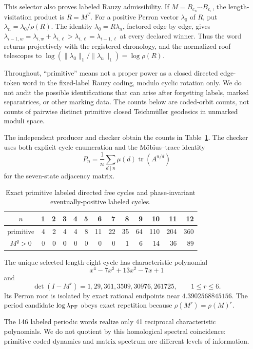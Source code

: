 \documentclass[11pt]{article}
\theoremstyle{remark}
\begin{document}
This selector also proves labeled Rauzy admissibility.  If
$M=B_{e_n}\cdots B_{e_1}$, the length-visitation product is $R=M^T$.  For a
positive Perron vector $\lambda_0$ of $R$, put
$\lambda_n=\lambda_0/\rho(R)$.  The identity
$\lambda_0=R\lambda_n$, factored edge by edge, gives
$\lambda_{i-1,w}=\lambda_{i,w}+\lambda_{i,\ell}>
\lambda_{i,\ell}=\lambda_{i-1,\ell}$ at every declared winner.  Thus the word
returns projectively with the registered chronology, and the normalized roof
telescopes to $\log(\|\lambda_0\|_1/\|\lambda_n\|_1)=\log\rho(R)$.

Throughout, ``primitive'' means not a proper power as a closed directed
edge-token word in the fixed-label Rauzy coding, modulo cyclic rotation only.
We do not audit the possible identifications that can arise after forgetting
labels, marked separatrices, or other marking data.  The counts below are
coded-orbit counts, not counts of pairwise distinct primitive closed
Teichm\"uller geodesics in unmarked moduli space.

The independent producer and checker obtain the counts in
Table~\ref{tab:counts}.  The checker uses both explicit cycle enumeration and
the M\"obius--trace identity
\[
 P_n=\frac1n\sum_{d\mid n}\mu(d)\operatorname{tr}(A^{n/d})
\]
for the seven-state adjacency matrix.

\begin{table}[ht]
\centering
\small
\begin{tabular}{crrrrrrrrrrrr}
\toprule
$n$&1&2&3&4&5&6&7&8&9&10&11&12\\
\midrule
primitive&4&2&4&4&8&11&22&35&64&110&204&360\\
$M^q>0$&0&0&0&0&0&0&0&1&6&14&36&89\\
\bottomrule
\end{tabular}
\caption{Exact primitive labeled directed free cycles and phase-invariant
eventually-positive labeled cycles.}\label{tab:counts}
\end{table}

The unique selected length-eight cycle has characteristic polynomial
\[
 x^4-7x^3+13x^2-7x+1
\]
and
\[
 \det(I-M^r)=1,29,361,3509,30976,261725,
 \qquad 1\le r\le6.
\]
Its Perron root is isolated by exact rational endpoints near
$4.3902568845156$.  The period candidate $\log\lambda_{\rm PF}$ obeys exact
repetition because $\rho(M^r)=\rho(M)^r$.

The 146 labeled periodic words realize only 41 reciprocal characteristic
polynomials.  We do not quotient by this homological spectral coincidence:
primitive coded dynamics and matrix spectrum are different levels of
information.
\end{document}
